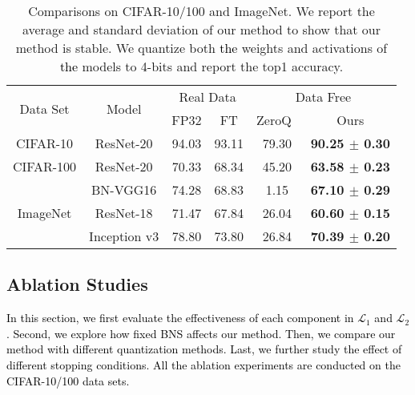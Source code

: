 \documentclass[runningheads]{llncs}
\def\mL{{\mathcal L}}
\def\lhk{\textcolor{black}}
\def\new{\textcolor{black}}
\begin{document}
\begin{table}[t]
\renewcommand\arraystretch{1.1}
\renewcommand{\tabcolsep}{5.0pt}
\begin{center}
\caption{Comparisons on CIFAR-10/100 and ImageNet. We report the average and standard deviation of our method to show that our method is stable. We quantize both \new{the} weights and activations of \new{the} models to 4-bits and report the top1 accuracy.}
\label{tb:comparison_CIFAR_ImageNet}
\begin{tabular}{c|c|cc|cc}
\hline
\multirow{2}{*}{Data Set} &\multirow{2}{*}{Model} & \multicolumn{2}{c}{Real Data} &\multicolumn{2}{|c}{Data Free }  \\ \cline{3-6}
 &  & FP32 & FT & ZeroQ~\cite{Cai_2020_CVPR} & Ours  \\ 
\hline
CIFAR-10  & ResNet-20 & 94.03 & 93.11 & 79.30 & \textbf{90.25 $\pm$ 0.30} \\
CIFAR-100 & ResNet-20 & 70.33 & 68.34 & 45.20 & \textbf{63.58 $\pm$ 0.23} \\
\hline
\multirow{3}{*}{ImageNet} & BN-VGG16 & 74.28 & 68.83 & 1.15 & \textbf{67.10 $\pm$ 0.29} \\
& ResNet-18 & 71.47 & 67.84 & 26.04 & \textbf{60.60 $\pm$ 0.15} \\
& Inception v3 & 78.80 & 73.80 & 26.84 & \textbf{70.39 $\pm$ 0.20}\\
\hline
\end{tabular}
\end{center}
\end{table}

\subsection{Ablation Studies}
\lhk{In this section, we first evaluate the effectiveness of each component in $\mL_{1}$ and  $\mL_{2}$. Second, we explore how fixed BNS affects our method. Then, we compare our method with different quantization methods. Last, we further study the effect of different stopping conditions. All the ablation experiments are conducted on the CIFAR-10/100 data sets.}
\end{document}

